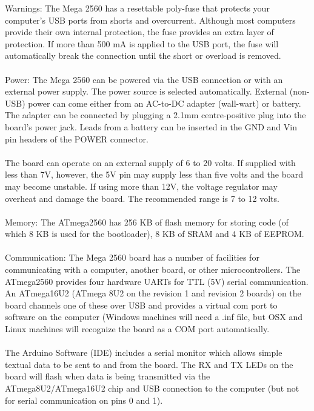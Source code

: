 \begin{enumerate}
Warnings: The Mega 2560 has a resettable poly-fuse that protects your computer's USB ports from shorts and overcurrent. Although most computers provide their own internal protection, the fuse provides an extra layer of protection. If more than 500 mA is applied to the USB port, the fuse will automatically break the connection until the short or overload is removed.
\\
\\
Power: The Mega 2560 can be powered via the USB connection or with an external power supply. The power source is selected automatically. External (non-USB) power can come either from an AC-to-DC adapter (wall-wart) or battery. The adapter can be connected by plugging a 2.1mm centre-positive plug into the board's power jack. Leads from a battery can be inserted in the GND and Vin pin headers of the POWER connector.
\\
\\
The board can operate on an external supply of 6 to 20 volts. If supplied with less than 7V, however, the 5V pin may supply less than five volts and the board may become unstable. If using more than 12V, the voltage regulator may overheat and damage the board. The recommended range is 7 to 12 volts.
\\
\\
Memory: The ATmega2560 has 256 KB of flash memory for storing code (of which 8 KB is used for the bootloader), 8 KB of SRAM and 4 KB of EEPROM.
\\
\\
Communication: The Mega 2560 board has a number of facilities for communicating with a computer, another board, or other microcontrollers. The ATmega2560 provides four hardware UARTs for TTL (5V) serial communication. An ATmega16U2 (ATmega 8U2 on the revision 1 and revision 2 boards) on the board channels one of these over USB and provides a virtual com port to software on the computer (Windows machines will need a .inf file, but OSX and Linux machines will recognize the board as a COM port automatically.
\\
\\
 The Arduino Software (IDE) includes a serial monitor which allows simple textual data to be sent to and from the board. The RX and TX LEDs on the board will flash when data is being transmitted via the ATmega8U2/ATmega16U2 chip and USB connection to the computer (but not for serial communication on pins 0 and 1).


\end{enumerate}
